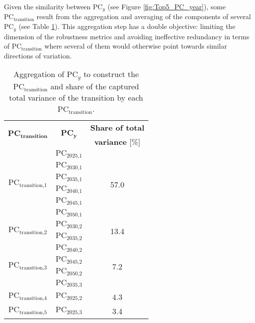 Given the similarity between $\text{PC}_y$ (see Figure \ref{fig:Top5_PC_year}), some $\text{PC}_{\text{transition}}$ result from the aggregation and averaging of the components of several $\text{PC}_y$ (see Table \ref{tab:PC_transition_aggregation}). This aggregation step has a double objective: limiting the dimension of the robustness metrics and avoiding ineffective redundancy in terms of $\text{PC}_{\text{transition}}$ where several of them would otherwise point towards similar directions of variation.

\begin{table}[htbp!]
\caption{Aggregation of $\text{PC}_y$ to construct the $\text{PC}_{\text{transition}}$ and share of the captured total variance of the transition by each $\text{PC}_{\text{transition}}$.}
\label{tab:PC_transition_aggregation}
\centering
\begin{tabular}{c c c}
\toprule
 \multirow{2}{*}{$\mathbf{\textbf{PC}_{\textbf{transition}}}$} & \multirow{2}{*}{$\mathbf{\textbf{PC}_{\textbf{y}}}$} & \textbf{Share of total} \\	
 &  & \textbf{variance} [\%] \\	
 \midrule
\multirow{6}{*}{$\text{PC}_{\text{transition,1}}$} & $\text{PC}_{\text{2025,1}}$ & \multirow{6}{*}{57.0}\\
& $\text{PC}_{\text{2030,1}}$ & \\
& $\text{PC}_{\text{2035,1}}$ & \\
& $\text{PC}_{\text{2040,1}}$ & \\
& $\text{PC}_{\text{2045,1}}$ & \\
& $\text{PC}_{\text{2050,1}}$ & \\
 \midrule
\multirow{2}{*}{$\text{PC}_{\text{transition,2}}$} & $\text{PC}_{\text{2030,2}}$ & \multirow{2}{*}{13.4}\\
& $\text{PC}_{\text{2035,2}}$ & \\
\midrule
\multirow{4}{*}{$\text{PC}_{\text{transition,3}}$} & $\text{PC}_{\text{2040,2}}$ & \multirow{4}{*}{7.2}\\
& $\text{PC}_{\text{2045,2}}$ & \\
& $\text{PC}_{\text{2050,2}}$ & \\
& $\text{PC}_{\text{2035,3}}$ & \\
 \midrule
$\text{PC}_{\text{transition,4}}$ & $\text{PC}_{\text{2025,2}}$ & 4.3\\
 \midrule
$\text{PC}_{\text{transition,5}}$ & $\text{PC}_{\text{2025,3}}$ & 3.4\\
\bottomrule							

\end{tabular}
\end{table}

